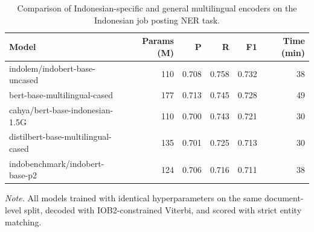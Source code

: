 \begin{table}[htbp]
\centering
\caption{Comparison of Indonesian-specific and general multilingual encoders on the Indonesian job posting NER task.}
\label{tab:model-benchmark}
\small
\begin{tabular}{l r r r r r}
\hline
\textbf{Model} & \textbf{Params (M)} & \textbf{P} & \textbf{R} & \textbf{F1} &
\textbf{Time (min)} \\
\hline
indolem/indobert-base-uncased & 110 & 0.708 & 0.758 & 0.732 & 38 \\
bert-base-multilingual-cased & 177 & 0.713 & 0.745 & 0.728 & 49 \\
cahya/bert-base-indonesian-1.5G & 110 & 0.700 & 0.743 & 0.721 & 30 \\
distilbert-base-multilingual-cased & 135 & 0.701 & 0.725 & 0.713 & 30 \\
indobenchmark/indobert-base-p2 & 124 & 0.706 & 0.716 & 0.711 & 38 \\
\hline
\end{tabular}

\vspace{2pt}
\footnotesize\textit{Note.} All models trained with identical hyperparameters
on the same document-level split, decoded with IOB2-constrained Viterbi, and
scored with strict entity matching.
\end{table}